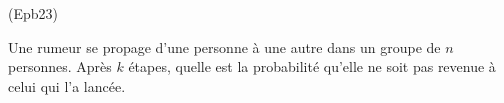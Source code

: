 \begin{tiny}(Epb23)\end{tiny} Une rumeur se propage d'une personne à une autre dans un groupe de $n$ personnes. Après $k$ étapes, quelle est la probabilité qu'elle ne soit pas revenue à celui qui l'a lancée. 